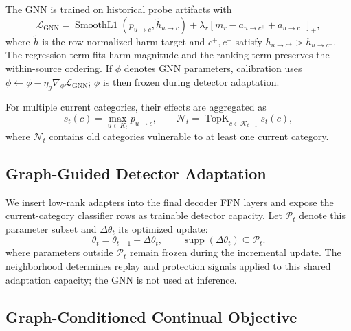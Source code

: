 The GNN is trained on historical probe artifacts with
\begin{equation}
\mathcal{L}_{\mathrm{GNN}}=\operatorname{SmoothL1}(p_{u\rightarrow c},
\widetilde h_{u\rightarrow c})+\lambda_r[m_r-a_{u\rightarrow c^+}
+a_{u\rightarrow c^-}]_+,
\label{eq:gnn_loss}
\end{equation}
where $\widetilde h$ is the row-normalized harm target and
$c^+,c^-$ satisfy $h_{u\rightarrow c^+}>h_{u\rightarrow c^-}$. The
regression term fits harm magnitude and the ranking term preserves the
within-source ordering. If $\phi$ denotes GNN parameters, calibration uses
$\phi\leftarrow\phi-\eta_g\nabla_\phi\mathcal{L}_{\mathrm{GNN}}$;
$\phi$ is then frozen during detector adaptation.

For multiple current categories, their effects are aggregated as
\begin{equation}
s_t(c)=\max_{u\in K_t}p_{u\rightarrow c},\qquad
\mathcal{N}_t=\operatorname{TopK}_{c\in\mathcal{K}_{t-1}}s_t(c),
\label{eq:interference_neighborhood}
\end{equation}
where $\mathcal{N}_t$ contains old categories vulnerable to at least one
current category.

\subsection{Graph-Guided Detector Adaptation}
\label{sec:graph_guided_detector_adaptation}

We insert low-rank adapters into the final decoder FFN layers and expose the
current-category classifier rows as trainable detector capacity. Let
$\mathcal{P}_t$ denote this parameter subset and $\Delta\theta_t$ its
optimized update:
\begin{equation}
\theta_t=\theta_{t-1}+\Delta\theta_t,\qquad
\operatorname{supp}(\Delta\theta_t)\subseteq\mathcal{P}_t.
\label{eq:graph_guided_update}
\end{equation}
where parameters outside $\mathcal{P}_t$ remain frozen during the
incremental update. The neighborhood determines replay and protection signals
applied to this shared adaptation capacity; the GNN is not used at inference.

\subsection{Graph-Conditioned Continual Objective}
\label{sec:graph_conditioned_objective}


